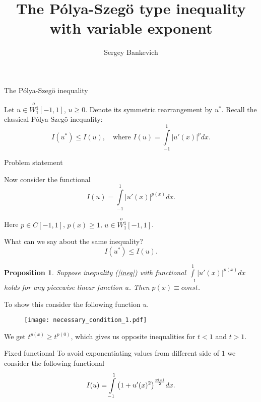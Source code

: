 \documentclass{beamer}\usepackage[]{graphicx}\usepackage[]{color}
\title{The P\'olya-Szeg\"o type inequality with variable exponent}
\author{Sergey Bankevich}
\institute{Saint Petersburg State University, Russia}
\renewcommand{\ge}{\geqslant}
\renewcommand{\le}{\leqslant}
\newcommand{\Wf}{\stackrel{o\ }{W{}_1^1}}
\newtheorem{prop}{Proposition}
\begin{document}
\begin{frame}
  \titlepage
\end{frame}

\begin{frame}{The P\'olya-Szeg\"o inequality}

Let $u \in \Wf[-1, 1]$, $u \ge 0$.
Denote its symmetric rearrangement by $u^*$.
Recall the classical P\'olya-Szeg\"o inequality:
$$I(u^*) \le I(u), \quad \mbox{where } I(u) = \int\limits_{-1}^1 |u'(x)|^p dx.$$

\end{frame}


\begin{frame}{Problem statement}

Now consider the functional
{\Large 
\begin{equation}
I(u) = \int\limits_{-1}^1 |u'(x)|^{p(x)} dx.
\label{sfunc}
\end{equation}
}

Here $p \in C[-1, 1]$, $p(x) \ge 1$, $u \in \Wf[-1, 1]$.

\pause

\bigskip
What can we say about the same inequality?
{\Large 
\begin{equation}
I(u^*) \le I(u).
\label{ineq}
\end{equation}
}

\end{frame}


\begin{frame}{}

\begin{prop}
Suppose inequality (\ref{ineq}) with functional $\int\limits_{-1}^1 |u'(x)|^{p(x)} dx$ holds for any piecewise linear function $u$.
Then $p(x) \equiv const$.
\end{prop}

To show this consider the following function $u$.
\begin{figure}
	\texttt{[image: necessary\_condition\_1.pdf]}
\end{figure}
We get $t^{p(x)} \ge t^{p(0)}$, which gives us opposite inequalities for $t < 1$ and $t > 1$.


\end{frame}


\begin{frame}{Fixed functional}
To avoid exponentiating values from different side of $1$ we consider the following functional
{\Large
\begin{equation}
I(u) = \int\limits_{-1}^1 \big(1 + u'(x)^2 \big)^{p(x) \over 2} dx.
\label{func}
\end{equation}
}

\end{frame}
\end{document}
